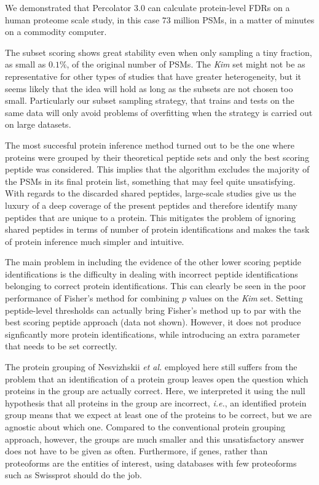 \documentclass{article}
\begin{document}
We demonstrated that Percolator 3.0 can calculate protein-level FDRs
on a human proteome scale study, in this case $73$ million PSMs, in a
matter of minutes on a commodity computer.

The subset scoring shows great stability even when only sampling a
tiny fraction, as small as $0.1\%$, of the original number of PSMs.
The {\em Kim} set might not be as representative for other types of
studies that have greater heterogeneity, but it seems likely that the
idea will hold as long as the subsets are not chosen too small.
Particularly our subset sampling strategy, that trains and tests on
the same data will only avoid problems of overfitting when the
strategy is carried out on large datasets.

The most succesful protein inference method turned out to be the one
where proteins were grouped by their theoretical peptide sets and only
the best scoring peptide was considered. This implies that the
algorithm excludes the majority of the PSMs in its final protein list,
something that may feel quite unsatisfying. With regards to the
discarded shared peptides, large-scale studies give us the luxury of a
deep coverage of the present peptides and therefore identify many
peptides that are unique to a protein. This mitigates the problem of
ignoring shared peptides in terms of number of protein identifications
and makes the task of protein inference much simpler and intuitive.

The main problem in including the evidence of the other lower scoring
peptide identifications is the difficulty in dealing with incorrect
peptide identifications belonging to correct protein identifications.
This can clearly be seen in the poor performance of Fisher's method
for combining $p$ values on the {\em Kim} set. Setting
peptide-level thresholds can actually bring Fisher's method up to par
with the best scoring peptide approach (data not shown). However,
it does not produce signficantly more protein identifications,
while introducing an extra parameter that needs to be set correctly.

The protein grouping of Nesvizhskii {\em et al.} employed here still
suffers from the problem that an identification of a protein group
leaves open the question which proteins in the group are actually
correct. Here, we interpreted it using the null hypothesis that all
proteins in the group are incorrect, {\em i.e.}, an identified protein
group means that we expect at least one of the proteins to be correct,
but we are agnostic about which one. Compared to the conventional
protein grouping approach, however, the groups are much smaller and
this unsatisfactory answer does not have to be given as often.
Furthermore, if genes, rather than proteoforms are the entities of
interest, using databases with few proteoforms such as Swissprot
should do the job.
\end{document}
